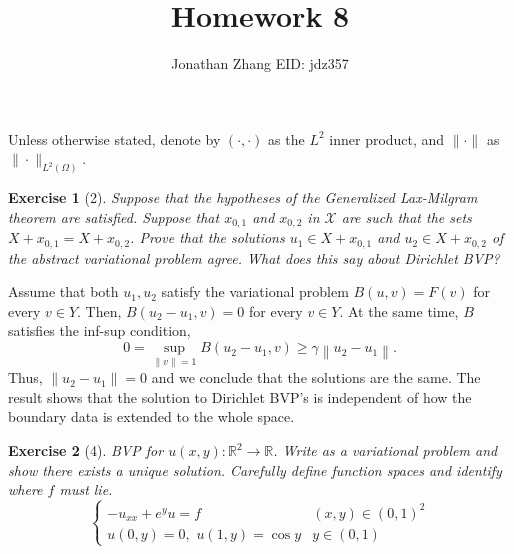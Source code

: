 \documentclass[letterpaper,twoside,11pt]{article}
\theoremstyle{mystyle}
\newtheorem*{exercise}{Exercise}
\newcommand{\R}{{\mathbb R}}
\begin{document}
\title{\vspace{-2\baselineskip} 
Homework 8
}
\author{Jonathan Zhang \qquad EID: { jdz357} }
\date{}
\maketitle

Unless otherwise stated, denote by $\left( \cdot, \cdot \right)$ as the $L^2$ inner product, and $\|\cdot\|$ as $\|\cdot \|_{L^2\left( \Omega \right)}$. 

\begin{exercise}[2]
  Suppose that the hypotheses of the Generalized Lax-Milgram theorem are satisfied. Suppose that $x_{0,1}$ and $x_{0,2}$ in $\mathcal X$ are such that the sets $X + x_{0,1} = X + x_{0,2}$. Prove that the solutions $u_1 \in X + x_{0,1}$ and $u_2 \in X + x_{0,2}$ of the abstract variational problem agree. What does this say about Dirichlet BVP? 
\end{exercise}

Assume that both $u_1, u_2$ satisfy the variational problem $B(u, v) = F(v)$ for every $v \in Y$. Then, $B(u_2 - u_1 , v) = 0$ for every $v \in Y$. At the same time, $B$ satisfies the inf-sup condition, 
\[0= \mathop {\sup }\limits_{\left\| v \right\| = 1} B\left( {{u_2} - {u_1},v} \right) \geqslant \gamma \left\| {{u_2} - {u_1}} \right\|.\]
Thus, $\|u_2-u_1\| = 0$ and we conclude that the solutions are the same. 
The result shows that the solution to Dirichlet BVP's is independent of how the boundary data is extended to the whole space. 

\begin{exercise}[4]
BVP for $u (x,y) : \R^2 \to \R$. Write as a variational problem and show there exists a unique solution. Carefully define function spaces and identify where $f$ must lie. 
\[\left\{ {\begin{array}{*{20}{c}}
  { - {u_{xx}} + {e^y}u = f}&{\left( {x,y} \right) \in {{\left( {0,1} \right)}^2}} \\[.2cm] 
  {u\left( {0,y} \right) = 0,\,\,u\left( {1,y} \right) = \cos y}&{y \in \left( {0,1} \right)} 
\end{array}} \right.\]
\end{exercise}
\end{document}
